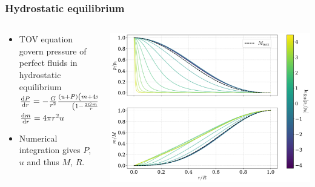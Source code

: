 \documentclass[aspectratio=169]{beamer}
\begin{document}
    \begin{frame}
        \frametitle{Hydrostatic equilibrium}

        \begin{columns}
        \begin{column}{0.4\textwidth}


        \begin{itemize}
            \itemsep 0.6cm
            \item TOV equation govern pressure of perfect fluids in hydrostatic equilibrium\\
            $
            \odv{P}{r} = - \frac{G}{r^2} 
            \frac{\left(u + P\right)
            \left(m + 4 \pi r^3 P\right)}
            {\left(1 - \frac{2Gm}{r} \right)}
            ,
            $ \\
            $
            \odv{m}{r} = 4 \pi r^2 u
            $
            \item Numerical integration gives $P$, $u$ and thus $M$, $R$. 
        \end{itemize}

        \end{column}
        \begin{column}{0.6\textwidth}
            \includegraphics[width=\textwidth]{../../scripts/figurer/pion_star/pressure_mass_pion_star.pdf}
        \end{column}
        \end{columns}
    \end{frame}
\end{document}
